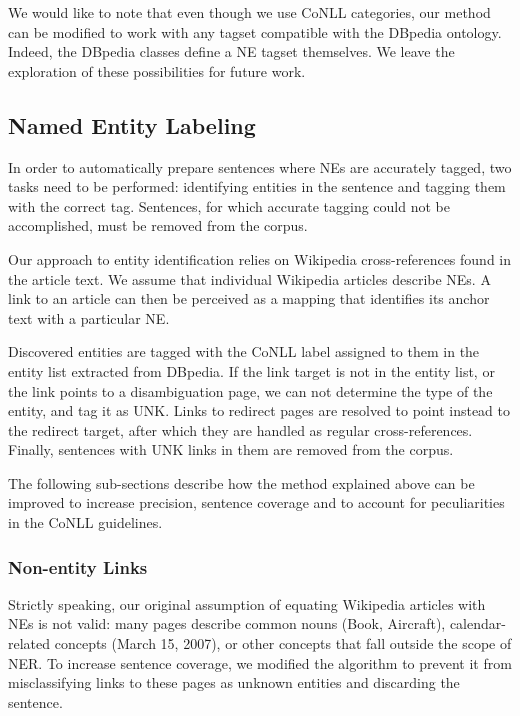 \documentclass[11pt]{article}
\begin{document}
We would like to note that even though we use CoNLL categories, our method can be modified to work with any tagset compatible with the DBpedia ontology. Indeed, the DBpedia classes define a NE tagset themselves. We leave the exploration of these possibilities for future work.

\subsection{Named Entity Labeling}

In order to automatically prepare sentences where NEs are accurately tagged, two tasks need to be performed: identifying entities in the sentence and tagging them with the correct tag. Sentences, for which accurate tagging could not be accomplished, must be removed from the corpus.

Our approach to entity identification relies on Wikipedia cross-references found in the article text. We assume that individual Wikipedia articles describe NEs. A link to an article can then be perceived as a mapping that identifies its anchor text with a particular NE.

Discovered entities are tagged with the CoNLL label assigned to them in the entity list extracted from DBpedia. If the link target is not in the entity list, or the link points to a disambiguation page, we can not determine the type of the entity, and tag it as UNK. Links to redirect pages are resolved to point instead to the redirect target, after which they are handled as regular cross-references. Finally, sentences with UNK links in them are removed from the corpus.

The following sub-sections describe how the method explained above can be improved to increase precision, sentence coverage and to account for peculiarities in the CoNLL guidelines.

\subsubsection{Non-entity Links}

Strictly speaking, our original assumption of equating Wikipedia articles with NEs is not valid: many pages describe common nouns (Book, Aircraft), calendar-related concepts (March 15, 2007), or other concepts that fall outside the scope of NER. To increase sentence coverage, we modified the algorithm to prevent it from misclassifying links to these pages as unknown entities and discarding the sentence.
\end{document}
